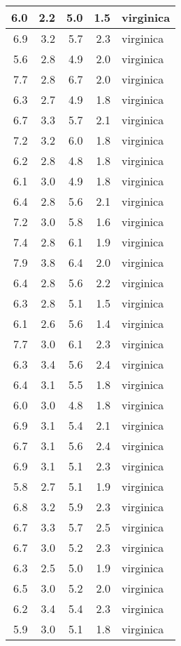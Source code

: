 \documentclass[]{article}
\begin{document}
\begin{tabular}{r|r|r|r|l}
\hline
6.0 & 2.2 & 5.0 & 1.5 & virginica\\
\hline
6.9 & 3.2 & 5.7 & 2.3 & virginica\\
\hline
5.6 & 2.8 & 4.9 & 2.0 & virginica\\
\hline
7.7 & 2.8 & 6.7 & 2.0 & virginica\\
\hline
6.3 & 2.7 & 4.9 & 1.8 & virginica\\
\hline
6.7 & 3.3 & 5.7 & 2.1 & virginica\\
\hline
7.2 & 3.2 & 6.0 & 1.8 & virginica\\
\hline
6.2 & 2.8 & 4.8 & 1.8 & virginica\\
\hline
6.1 & 3.0 & 4.9 & 1.8 & virginica\\
\hline
6.4 & 2.8 & 5.6 & 2.1 & virginica\\
\hline
7.2 & 3.0 & 5.8 & 1.6 & virginica\\
\hline
7.4 & 2.8 & 6.1 & 1.9 & virginica\\
\hline
7.9 & 3.8 & 6.4 & 2.0 & virginica\\
\hline
6.4 & 2.8 & 5.6 & 2.2 & virginica\\
\hline
6.3 & 2.8 & 5.1 & 1.5 & virginica\\
\hline
6.1 & 2.6 & 5.6 & 1.4 & virginica\\
\hline
7.7 & 3.0 & 6.1 & 2.3 & virginica\\
\hline
6.3 & 3.4 & 5.6 & 2.4 & virginica\\
\hline
6.4 & 3.1 & 5.5 & 1.8 & virginica\\
\hline
6.0 & 3.0 & 4.8 & 1.8 & virginica\\
\hline
6.9 & 3.1 & 5.4 & 2.1 & virginica\\
\hline
6.7 & 3.1 & 5.6 & 2.4 & virginica\\
\hline
6.9 & 3.1 & 5.1 & 2.3 & virginica\\
\hline
5.8 & 2.7 & 5.1 & 1.9 & virginica\\
\hline
6.8 & 3.2 & 5.9 & 2.3 & virginica\\
\hline
6.7 & 3.3 & 5.7 & 2.5 & virginica\\
\hline
6.7 & 3.0 & 5.2 & 2.3 & virginica\\
\hline
6.3 & 2.5 & 5.0 & 1.9 & virginica\\
\hline
6.5 & 3.0 & 5.2 & 2.0 & virginica\\
\hline
6.2 & 3.4 & 5.4 & 2.3 & virginica\\
\hline
5.9 & 3.0 & 5.1 & 1.8 & virginica\\
\hline
\end{tabular}
\end{document}
